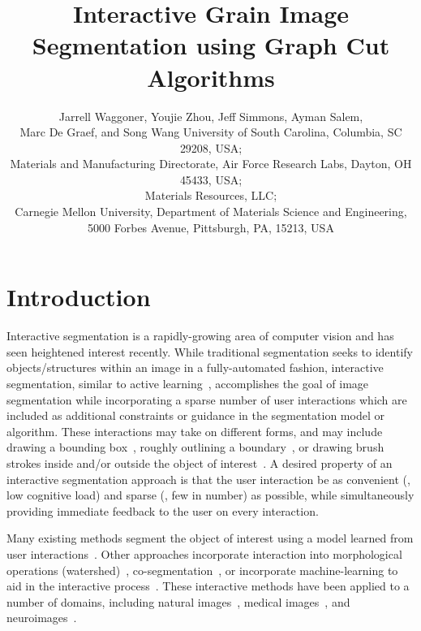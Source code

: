 \documentclass[]{spie}  %
\title{Interactive Grain Image Segmentation using Graph Cut Algorithms}
\author{Jarrell Waggoner\supit{a}, Youjie Zhou\supit{a}, Jeff Simmons\supit{b}, Ayman Salem\supit{c}, \\ Marc De Graef\supit{d}, and Song Wang\supit{a}
\skiplinehalf
\supit{a}University of South Carolina, Columbia, SC 29208, USA; \\
\supit{b}Materials and Manufacturing Directorate, Air Force Research
Labs, Dayton, OH 45433, USA; \\
\supit{c} Materials Resources, LLC;\\ 
\supit{d} Carnegie Mellon University, Department of Materials Science and Engineering, 5000 Forbes Avenue, Pittsburgh, PA, 15213, USA
}
\begin{document}
 
  \maketitle 

\begin{abstract}
% 

\end{abstract}




\section{Introduction}
\label{sec:intro}

Interactive segmentation is a rapidly-growing area of computer vision
and has seen heightened interest recently\cite{kuang:12,straehle:12}.
While traditional segmentation seeks to identify objects/structures
within an image in a fully-automated fashion, interactive
segmentation, similar to active learning~\cite{settles:09},
accomplishes the goal of image segmentation while incorporating a
sparse number of user interactions which are included as additional
constraints or guidance in the segmentation model or algorithm.
These interactions may take on different forms, and may include
drawing a bounding box~\cite{rother:04}, roughly outlining a
boundary~\cite{mortensen:95}, or drawing brush strokes inside and/or
outside the object of interest~\cite{santner:10, unger:08, boykov:01b,
  vezhnevets:95}.  A desired property of an interactive segmentation
approach is that the user interaction be as convenient (\ie, low
cognitive load) and sparse (\ie, few in number) as possible, while
simultaneously providing immediate feedback to the user on every
interaction.

Many existing methods segment the object of interest using a model
learned from user interactions~\cite{boykov:01b, unger:08, rother:04}.
Other approaches incorporate interaction into morphological operations
(watershed)~\cite{straehle:12}, co-segmentation~\cite{batra:10}, or
incorporate machine-learning to aid in the interactive
process~\cite{top:11, kuang:12}.  These interactive methods have been
applied to a number of domains, including natural
images~\cite{rother:04}, medical images~\cite{boykov:00}, and
neuroimages~\cite{straehle:11, straehle:12}.
\end{document}
